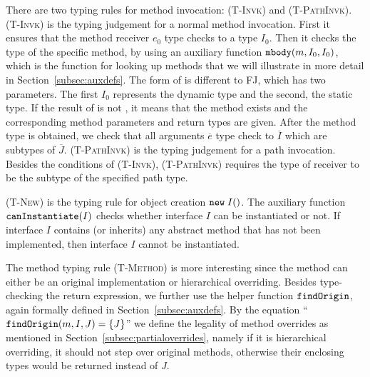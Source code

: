 There are two typing rules for method invocation: \textsc{(T-Invk)}
and \textsc{(T-PathInvk)}. \textsc{(T-Invk)} is the typing judgement
for a normal method invocation. First it ensures that the method
receiver $e_0$ type checks to a type $I_0$. Then it checks the type of
the specific method, by using an auxiliary function $\texttt{mbody}(m, I_0,
I_0)$, which is the function for looking up methods that we will
illustrate in more detail in Section~\ref{subsec:auxdefs}. The form of
\mbody{} is different to FJ, which has two parameters. The first $I_0$
represents the dynamic type and the second, the static type. If the
result of \mbody is not \Undefined, it means that the method exists and the corresponding method parameters and return types are given. After the method type is obtained, we check that all arguments $\overline{e}$ type check to $\overline{I}$ which are subtypes of $\overline{J}$. \textsc{(T-PathInvk)} is the typing judgement for a path invocation. Besides the conditions of \textsc{(T-Invk)}, \textsc{(T-PathInvk)} requires the type of receiver to be the subtype of the specified path type. 

\textsc{(T-New)} is the typing rule for object creation $\texttt{new} \; I()$. The auxiliary function $\texttt{canInstantiate}(I)$ checks whether interface $I$ can be instantiated or not. If interface $I$ contains (or inherits) any abstract method that has not been implemented, then interface $I$ cannot be instantiated.

The method typing rule \textsc{(T-Method)} is more interesting since the method can either be an original implementation or hierarchical overriding.
Besides type-checking the return expression,
we further use the helper function $\texttt{findOrigin}$, again formally defined in Section~\ref{subsec:auxdefs}.
By the equation ``$\texttt{findOrigin}(m, I, J) = \{J\}$'' we define the legality of method overrides as mentioned in Section~\ref{subsec:partialoverrides}, namely if it is hierarchical overriding, it should not step over original methods, otherwise
their enclosing types would be returned instead of $J$.

